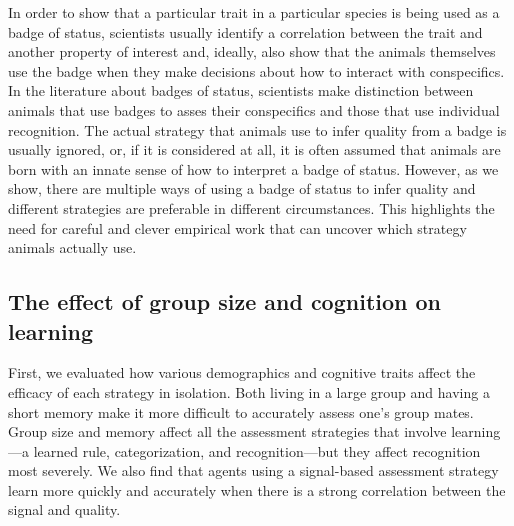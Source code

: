 In order to show that a particular trait in a particular species is being used as a badge of status, scientists usually identify a correlation between the trait and another property of interest and, ideally, also show that the animals themselves use the badge when they make decisions about how to interact with conspecifics. In the literature about badges of status, scientists make distinction between animals that use badges to asses their conspecifics and those that use individual recognition. The actual strategy that animals use to infer quality from a badge is usually ignored, or, if it is considered at all, it is often assumed that animals are born with an innate sense of how to interpret a badge of status. However, as we show, there are multiple ways of using a badge of status to infer quality and different strategies are preferable in different circumstances. This highlights the need for careful and clever empirical work that can uncover which strategy animals actually use. %

\subsection*{The effect of group size and cognition on learning} 

First, we evaluated how various demographics and cognitive traits affect the efficacy of each strategy in isolation. Both living in a large group and having a short memory make it more difficult to accurately assess one's group mates. Group size and memory affect all the assessment strategies that involve learning---a learned rule, categorization, and recognition---but they affect recognition most severely. We also find that agents using a signal-based assessment strategy learn more quickly and accurately when there is a strong correlation between the signal and quality. 


